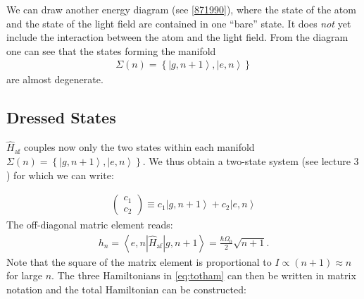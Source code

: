 \documentclass[10pt]{article}
\let\cite\citep
\providecommand\citep{\cite}
\newcommand{\ket}[1]{\ensuremath{\left|#1\right\rangle}}
\newcommand{\braket}[1]{\ensuremath{\left\langle#1\right\rangle}}
\begin{document}
We can draw another energy diagram (see \ref{871990}), where the state of the atom and the state of the light field are contained in one ``bare'' state. It does \emph{not} yet include the interaction between the atom and the light field. From the diagram one can see that the states forming the manifold
\begin{align}
\Sigma (n) = \left\{ \ket{g,n+1}, \ket{e,n} \right\}
\end{align}
are almost degenerate.

\subsection{Dressed States}

$\hat{H}_\textrm{af}$ couples now only the two states within each manifold $\Sigma(n)= \left\{ \ket{g,n+1}, \ket{e,n} \right\}$. We thus obtain a two-state system (see lecture 3 \cite{Jendrzejewskia})  for which we can write:

\begin{align}
\left( \begin{array}{c} c_1 \\ c_2 \end{array} \right) \equiv c_1 \ket{g,n+1} + c_2 \ket{e,n}
\end{align}
The off-diagonal matric element reads:
\begin{align}
h_n = \braket{e,n|\hat{H}_\textrm{af}|g,n+1} = \frac{\hbar \Omega_0}{2} \sqrt{n+1}.
\end{align}
Note that the square of the matrix element is proportional to $I \propto (n+1) \approx n$ for large $n$.
The three Hamiltonians in \eqref{eq:totham} can then be written in matrix notation and the total Hamiltonian can be constructed:
\end{document}
